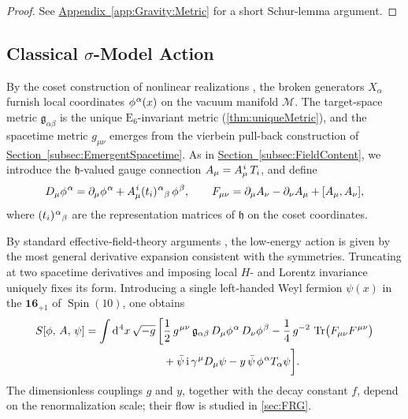 \documentclass[pdflatex,sn-mathphys-num]{sn-jnl}
\theoremstyle{thmstyleone}
\theoremstyle{thmstyletwo}%
\theoremstyle{thmstylethree}%
\newcommand{\E}[1]{\mathrm{E_{#1}}}
\newcommand{\M}{\mathcal{M}}
\newcommand{\ESix}{\E{6}}
\newcommand{\Tr}{\operatorname{Tr}}
\newcommand{\sm}{\hspace{.065em}}
\newcommand{\Spin}{\operatorname{Spin}}
\newcommand{\appref}[1]{\hyperref[#1]{Appendix~\ref*{#1}}}
\newcommand{\subsecref}[1]{\hyperref[#1]{Section~\ref*{#1}}}
\newcommand{\smexp}[1]{^{\sm #1}}
\newcommand{\dv}[1]{\mathrm{d}\smexp{#1}}
\begin{document}
\begin{proof}
See \appref{app:Gravity:Metric} for a short Schur-lemma argument.
\end{proof}

\subsection{Classical \texorpdfstring{$\sigma$}{Sigma}-Model Action}
\label{subsec:action}

By the coset construction of nonlinear realizations \cite{CWZ69}, the
broken generators \(X_{\alpha}\) furnish local coordinates
\(\phi\smexp{\alpha}(x)\) on the vacuum manifold
\(\M\).  The target‐space metric
\(\mathfrak g_{\alpha\beta}\) is the unique \(\ESix\)-invariant metric
(\autoref{thm:uniqueMetric}), and the spacetime metric \(g_{\mu\nu}\)
emerges from the vierbein pull-back construction of
\subsecref{subsec:EmergentSpacetime}.  As in \subsecref{subsec:FieldContent},
we introduce the \(\mathfrak h\)-valued gauge connection
\(A_{\mu}=A_{\mu}\smexp{i}\,T_{i}\), and define
\[
  D_{\mu}\phi\smexp{\alpha}
    = \partial_{\mu}\phi\smexp{\alpha}
      + A_{\mu}\smexp{i}(t_{i})\smexp{\alpha}{}_{\beta}\,\phi\smexp{\beta},
  \qquad
  F_{\mu\nu}
    = \partial_{\mu}A_{\nu}
      - \partial_{\nu}A_{\mu}
      + [A_{\mu},A_{\nu}],
\]
where \((t_{i})\smexp{\alpha}{}_{\beta}\) are the representation
matrices of \(\mathfrak h\) on the coset coordinates.

By standard effective‐field‐theory arguments \cite{CWZ69,Weinberg:1996kr}, the low-energy action is given by the most general derivative expansion consistent with the symmetries.  Truncating at two spacetime derivatives and imposing local \(H\)- and Lorentz invariance uniquely fixes its form.  Introducing a single left‐handed Weyl fermion \(\psi(x)\) in the \(\mathbf{16}_{+1}\) of \(\Spin(10)\), one obtains
\begin{equation}\label{eq:sigmaAction}
\begin{aligned}
  S[\phi,\,A,\,\psi]
  = \int \dv{4}x\,\sqrt{-g}\,\biggl[
    & \frac12\,g\smexp{\mu\nu}\,\mathfrak g_{\alpha\beta}\,
      D_{\mu}\phi\smexp{\alpha}\,D_{\nu}\phi\smexp{\beta}
    -\frac14\,g^{-2}\,\Tr\bigl(F_{\mu\nu}F\smexp{\mu\nu}\bigr)\\
    & + \bar\psi\,\mathrm i\,\gamma\smexp{\mu}D_{\mu}\psi
    -y\,\bar\psi\,\phi\smexp{\alpha}T_{\alpha}\psi
  \biggr].
\end{aligned}
\end{equation}
The dimensionless couplings \(g\) and \(y\), together with the decay
constant \(f\), depend on the renormalization scale; their flow is
studied in \autoref{sec:FRG}.
\end{document}
